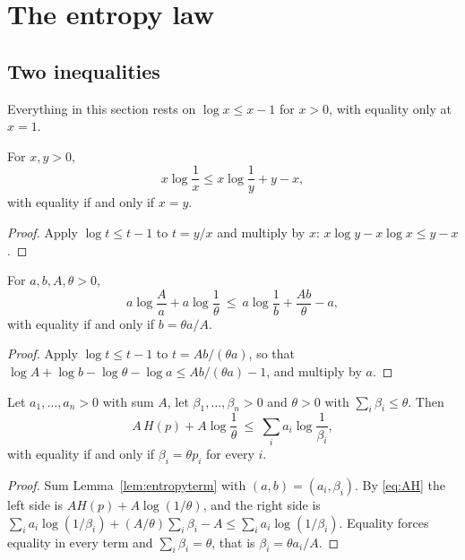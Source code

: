 \section{The entropy law}\label{sec:entropy}

\subsection{Two inequalities}

Everything in this section rests on $\log x\le x-1$ for $x>0$, with equality only at $x=1$.

\begin{lemma}\label{lem:gibbs}
For $x,y>0$,
\[
x\log\frac1x\le x\log\frac1y+y-x,
\]
with equality if and only if $x=y$.
\end{lemma}

\begin{proof}
Apply $\log t\le t-1$ to $t=y/x$ and multiply by $x$: $x\log y-x\log x\le y-x$.
\end{proof}

\begin{lemma}\label{lem:entropyterm}
For $a,b,A,\theta>0$,
\[
a\log\frac Aa+a\log\frac1\theta\ \le\ a\log\frac1b+\frac{Ab}{\theta}-a,
\]
with equality if and only if $b=\theta a/A$.
\end{lemma}

\begin{proof}
Apply $\log t\le t-1$ to $t=Ab/(\theta a)$, so that $\log A+\log b-\log\theta-\log a\le Ab/(\theta a)-1$, and multiply by $a$.
\end{proof}

\begin{proposition}\label{prop:entropyineq}
Let $a_{1},\dots,a_{n}>0$ with sum $A$, let $\beta_{1},\dots,\beta_{n}>0$ and $\theta>0$ with $\sum_{i}\beta_{i}\le\theta$. Then
\begin{equation}\label{eq:entropyineq}
A\,H(p)+A\log\frac1\theta\ \le\ \sum_{i}a_{i}\log\frac1{\beta_{i}},
\end{equation}
with equality if and only if $\beta_{i}=\theta p_{i}$ for every $i$.
\end{proposition}

\begin{proof}
Sum Lemma~\ref{lem:entropyterm} with $(a,b)=(a_{i},\beta_{i})$. By \eqref{eq:AH} the left side is $AH(p)+A\log(1/\theta)$, and the right side is $\sum_{i}a_{i}\log(1/\beta_{i})+(A/\theta)\sum_{i}\beta_{i}-A\le\sum_{i}a_{i}\log(1/\beta_{i})$. Equality forces equality in every term and $\sum_{i}\beta_{i}=\theta$, that is $\beta_{i}=\theta a_{i}/A$.
\end{proof}

